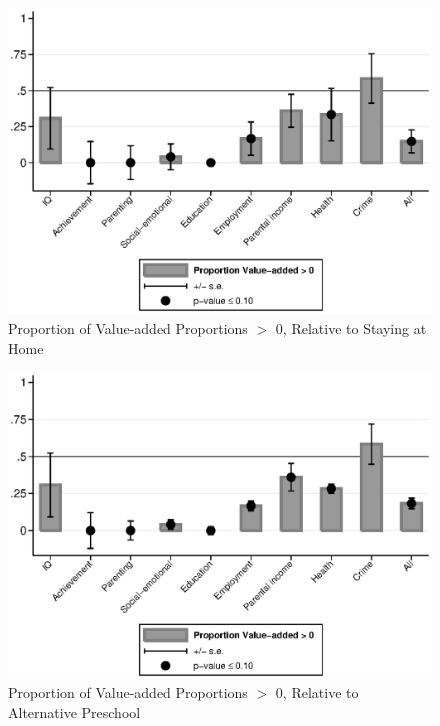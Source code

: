 \begin{figure}
\centering
\caption{Proportion of Value-added Proportions $>$ 0, Relative to Staying at Home}\label{fig5}
\includegraphics[width=\textwidth]{output/gendergaps-valueadded-proportion-home}
\end{figure}

\begin{figure}
\centering
\caption{Proportion of Value-added Proportions $>$ 0, Relative to Alternative Preschool}\label{fig6}
\includegraphics[width=\textwidth]{output/gendergaps-valueadded-proportion-alt}
\end{figure}

